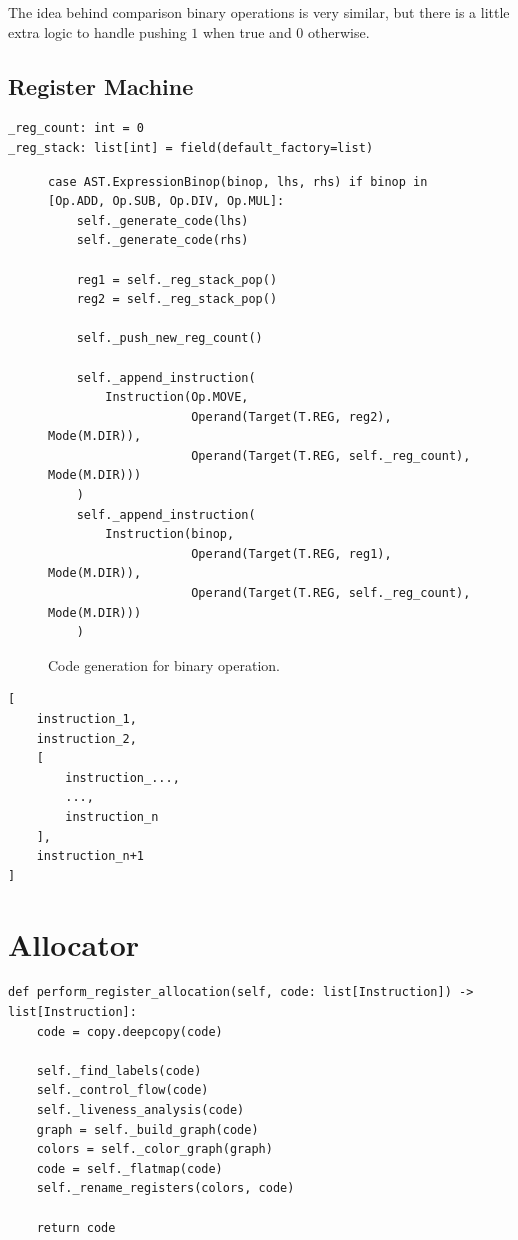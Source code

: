 The idea behind comparison binary operations is very similar, but there is a little extra logic to handle pushing $1$ when true and $0$ otherwise.

\subsection{Register Machine}
\cite{ModernCompilerImplementation}
\begin{verbatim}
_reg_count: int = 0
_reg_stack: list[int] = field(default_factory=list)
\end{verbatim}

\begin{figure}[H]
\begin{verbatim}
case AST.ExpressionBinop(binop, lhs, rhs) if binop in [Op.ADD, Op.SUB, Op.DIV, Op.MUL]:
    self._generate_code(lhs)
    self._generate_code(rhs)

    reg1 = self._reg_stack_pop()
    reg2 = self._reg_stack_pop()

    self._push_new_reg_count()

    self._append_instruction(
        Instruction(Op.MOVE,
                    Operand(Target(T.REG, reg2), Mode(M.DIR)),
                    Operand(Target(T.REG, self._reg_count), Mode(M.DIR)))
    )
    self._append_instruction(
        Instruction(binop,
                    Operand(Target(T.REG, reg1), Mode(M.DIR)),
                    Operand(Target(T.REG, self._reg_count), Mode(M.DIR)))
    )
\end{verbatim}
\caption{Code generation for binary operation.}
\label{fig:binop}
\end{figure}

\begin{verbatim}
[
    instruction_1,
    instruction_2,
    [
        instruction_...,
        ..., 
        instruction_n
    ],
    instruction_n+1
]
\end{verbatim}

\newpage

\section{Allocator}

\begin{verbatim}
def perform_register_allocation(self, code: list[Instruction]) -> list[Instruction]:
    code = copy.deepcopy(code)

    self._find_labels(code)
    self._control_flow(code)
    self._liveness_analysis(code)
    graph = self._build_graph(code)
    colors = self._color_graph(graph)
    code = self._flatmap(code)
    self._rename_registers(colors, code)

    return code
\end{verbatim}

